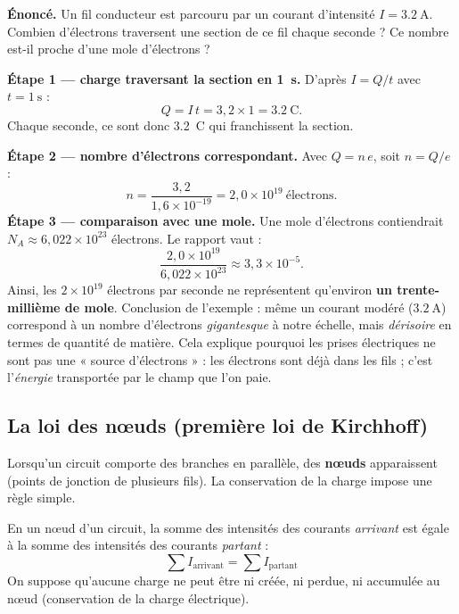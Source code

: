 \documentclass[11pt,a4paper]{article}
\begin{document}
\begin{exemple}
\textbf{Énoncé.} Un fil conducteur est parcouru par un courant d'intensité $I=\SI{3,2}{\ampere}$.
Combien d'électrons traversent une section de ce fil chaque seconde ? Ce nombre est-il proche d'une
mole d'électrons ?

\smallskip
\textbf{Étape 1 — charge traversant la section en \SI{1}{\second}.} D'après $I=Q/t$ avec $t=\SI{1}{\second}$ :
\[ Q = I\,t = 3{,}2 \times 1 = \SI{3,2}{\coulomb}. \]
Chaque seconde, ce sont donc \SI{3,2}{\coulomb} qui franchissent la section.

\smallskip
\textbf{Étape 2 — nombre d'électrons correspondant.} Avec $Q=n\,e$, soit $n=Q/e$ :
\[ n = \frac{3{,}2}{1{,}6\times10^{-19}} = 2{,}0\times10^{19}\ \text{électrons}. \]
\textbf{Étape 3 — comparaison avec une mole.} Une mole d'électrons contiendrait $N_A\approx
6{,}022\times10^{23}$ électrons. Le rapport vaut :
\[ \frac{2{,}0\times10^{19}}{6{,}022\times10^{23}} \approx 3{,}3\times10^{-5}. \]
Ainsi, les $2\times10^{19}$ électrons par seconde ne représentent qu'environ \textbf{un trente-millième
de mole}. Conclusion de l'exemple : même un courant modéré ($\SI{3,2}{\ampere}$) correspond à un nombre
d'électrons \emph{gigantesque} à notre échelle, mais \emph{dérisoire} en termes de quantité de matière.
Cela explique pourquoi les prises électriques ne sont pas une « source d'électrons » : les électrons
sont déjà dans les fils ; c'est l'\emph{énergie} transportée par le champ que l'on paie.
\end{exemple}

\subsection{La loi des nœuds (première loi de Kirchhoff)}

Lorsqu'un circuit comporte des branches en parallèle, des \textbf{nœuds} apparaissent (points de
jonction de plusieurs fils). La conservation de la charge impose une règle simple.

\begin{theoreme}
En un nœud d'un circuit, la somme des intensités des courants \emph{arrivant} est égale à la somme
des intensités des courants \emph{partant} :
\[ \boxed{\;\sum I_{\text{arrivant}} = \sum I_{\text{partant}}\;} \]
On suppose qu'aucune charge ne peut être ni créée, ni perdue, ni accumulée au nœud (conservation de
la charge électrique).
\end{theoreme}
\end{document}
